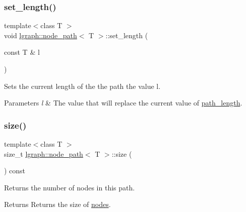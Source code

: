 \subsubsection{\texorpdfstring{set\+\_\+length()}{set\_length()}}
{\footnotesize\ttfamily template$<$class T $>$ \\
void \hyperlink{classlgraph_1_1node__path}{lgraph\+::node\+\_\+path}$<$ T $>$\+::set\+\_\+length (\begin{DoxyParamCaption}\item[{const T \&}]{l }\end{DoxyParamCaption})}



Sets the current length of the the path the value l. 


\begin{DoxyParams}{Parameters}
{\em l} & The value that will replace the current value of \hyperlink{classlgraph_1_1node__path_a3461f9839615e5bc4837d24438117f16}{path\+\_\+length}. \\
\hline
\end{DoxyParams}
\mbox{\label{classlgraph_1_1node__path_a3629afe5f34d1ea3b220aa266e0b1ada}} 
\subsubsection{\texorpdfstring{size()}{size()}}
{\footnotesize\ttfamily template$<$class T $>$ \\
size\+\_\+t \hyperlink{classlgraph_1_1node__path}{lgraph\+::node\+\_\+path}$<$ T $>$\+::size (\begin{DoxyParamCaption}{ }\end{DoxyParamCaption}) const}



Returns the number of nodes in this path. 

\begin{DoxyReturn}{Returns}
Returns the size of \hyperlink{classlgraph_1_1node__path_ae2335b4883c602186ce2dbba9d679b1e}{nodes}. 
\end{DoxyReturn}
\mbox{\label{classlgraph_1_1node__path_aa488e5ee537e4eff40c46a545a19da50}} 
